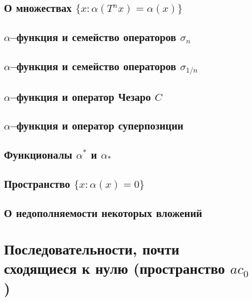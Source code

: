 \documentclass[12pt,a4paper,openbib]{report}
\theoremstyle{definition}
\begin{document}
	\section{О множествах $\{x: \alpha(T^n x) = \alpha(x)\}$}
	

	\section{$\alpha$--функция и семейство операторов $\sigma_n$}
	

	\section{$\alpha$--функция и семейство операторов $\sigma_{1/n}$}
	

	\section{$\alpha$--функция и оператор Чезаро $C$}
	

	\section{$\alpha$--функция и оператор суперпозиции}
	

	\section{Функционалы $\alpha^*$ и $\alpha_*$}
	

	\section{Пространство $\{x: \alpha(x) = 0\}$}
	

	\section{О недополняемости некоторых вложений}
	


\chapter{Последовательности, почти сходящиеся к нулю (пространство $ac_0$)}
\end{document}
